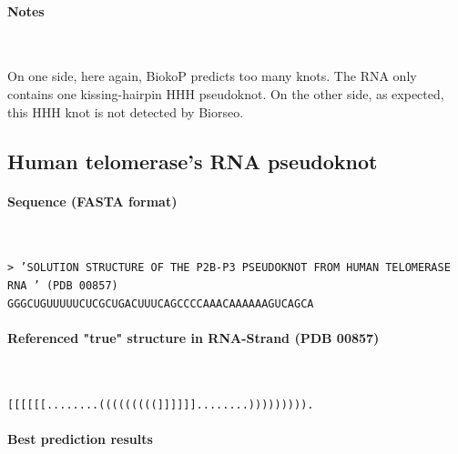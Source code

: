 \documentclass{article}
\begin{document}
\paragraph{Notes} ~

On one side, here again, BiokoP predicts too many knots. The RNA only contains one kissing-hairpin HHH pseudoknot. On the other side, as expected, this HHH knot is not detected by Biorseo.

\subsection{Human telomerase's RNA pseudoknot}

\paragraph{Sequence (FASTA format)} ~ 

\texttt{>  'SOLUTION STRUCTURE OF THE P2B-P3 PSEUDOKNOT FROM HUMAN TELOMERASE RNA ' (PDB 00857)\\
GGGCUGUUUUUCUCGCUGACUUUCAGCCCCAAACAAAAAAGUCAGCA}

\paragraph{Referenced "true" structure in RNA-Strand (PDB 00857)} ~ 

\texttt{[[[[[[........(((((((((]]]]]]........))))))))).}

\paragraph{Best prediction results} ~ 
\end{document}
